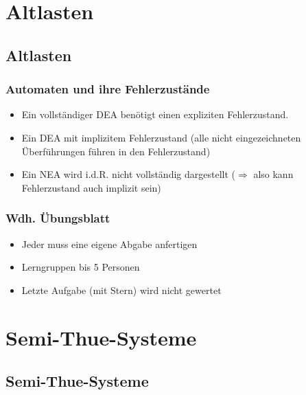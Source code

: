 



\section{Altlasten}
\subsection{Altlasten}

\begin{frame}
\frametitle{Automaten und ihre Fehlerzustände}
\begin{itemize}
	\item Ein vollständiger DEA benötigt einen expliziten Fehlerzustand.
	\item Ein DEA mit implizitem Fehlerzustand (alle nicht eingezeichneten Überführungen führen in den Fehlerzustand)
	\item Ein NEA wird i.d.R. nicht vollständig dargestellt ($\Rightarrow$ also kann Fehlerzustand auch implizit sein)
\end{itemize}
\end{frame}

\begin{frame}
\frametitle{Wdh. Übungsblatt}
\begin{itemize}
	\item Jeder muss eine eigene Abgabe anfertigen
	\item Lerngruppen bis 5 Personen
	\item Letzte Aufgabe (mit Stern) wird nicht gewertet
\end{itemize}
\end{frame}

\section{Semi-Thue-Systeme}
\subsection{Semi-Thue-Systeme}

